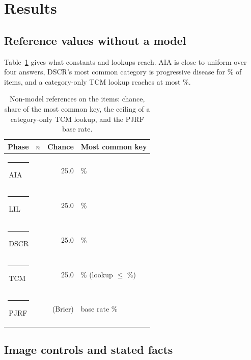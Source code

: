 \documentclass[11pt]{article}
\newcommand{\hdrrow}{\rowcolor{tblhdr}}
\newcommand{\bandrow}{\rowcolor{tblband}}
\newcommand{\ptag}[2]{\textcolor{#1}{\rule[0.02em]{0.72em}{0.72em}}\,#2}
\newcommand{\ptagAIA}{\ptag{aiacol}{AIA}}
\newcommand{\ptagLIL}{\ptag{lilcol}{LIL}}
\newcommand{\ptagDSCR}{\ptag{dscrcol}{DSCR}}
\newcommand{\ptagPJRF}{\ptag{pjrfcol}{PJRF}}
\newcommand{\ptagTCM}{\ptag{tcmcol}{TCM}}
\begin{document}
\section{Results}
\label{sec:results}

\subsection{Reference values without a model}

Table~\ref{tab:baselines} gives what constants and lookups reach. AIA is close to uniform over four answers, DSCR's most common category is progressive disease for \vfourMajorityDSCR{}\% of items, and a category-only TCM lookup reaches at most \vfourTcmLookupEsc{}\%.

\begin{table}[t]
\centering
\footnotesize
\setlength{\tabcolsep}{3pt}
\begin{tabular}{lrrl}
\toprule
\hdrrow Phase & $n$ & Chance & Most common key \\
\midrule
\ptagAIA & \vfourNAIA{} & 25.0 & \vfourMajorityAIA{}\% \\
\bandrow \ptagLIL & \vfourNLIL{} & 25.0 & \vfourMajorityLIL{}\% \\
\ptagDSCR & \vfourNDSCR{} & 25.0 & \vfourMajorityDSCR{}\% \\
\bandrow \ptagTCM & \vfourNTCM{} & 25.0 & \vfourMajorityTCM{}\% (lookup $\le$ \vfourTcmLookupEsc{}\%) \\
\ptagPJRF & \vfourNPJRF{} & (Brier) & base rate \vfourPjrfBase{}\% \\
\bottomrule
\end{tabular}
\caption{Non-model references on the items: chance, share of the most common key, the ceiling of a category-only TCM lookup, and the PJRF base rate.}
\label{tab:baselines}
\end{table}

\subsection{Image controls and stated facts}

\begin{table}[t]
\centering
\scriptsize
\setlength{\tabcolsep}{2pt}

\caption{E1: accuracy (\%) with the image and text only (no upstream context), the paired difference in points with its bootstrap interval, an add-half sparse-data interval (Add-half CI), the exact McNemar $p$ (unadjusted), the share of items whose answer differs between the two arms (answers differ), and the interval reading (unadjusted; only Llama-4-Scout on DSCR survives Holm correction). Answers-differ is over items in all three arms (AIA 46, LIL 38, DSCR 42 of 46); accuracy is over all items per phase (AIA 46, LIL 38, DSCR 46). AIA is the positive control.}
\label{tab:e1}
\end{table}
\end{document}
